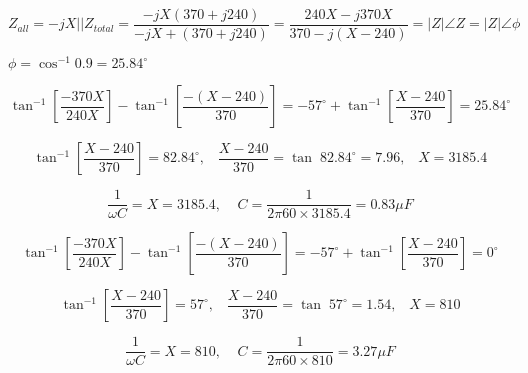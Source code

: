 {\newpage\clearpage
{}%
\begin{displaymath}	Z_{all}=-jX || Z_{total}=\frac{-jX(370+j240)}{-jX+(370+j240)}
  	=\frac{240X-j370X}{370-j(X-240)}=|Z|\angle Z=|Z|\angle \phi	\end{displaymath}%
\lthtmldisplayZ
\lthtmlcheckvsize\clearpage}

{\newpage\clearpage
{}%
$\phi=\cos^{-1} 0.9=25.84^\circ$%
\lthtmlinlinemathZ
\lthtmlcheckvsize\clearpage}

{\newpage\clearpage
{}%
\begin{displaymath}	\tan^{-1}[\frac{-370X}{240X}]-\tan^{-1}[\frac{-(X-240)}{370}]=
  	-57^\circ+\tan^{-1}[\frac{X-240}{370}]=25.84^\circ \end{displaymath}%
\lthtmldisplayZ
\lthtmlcheckvsize\clearpage}

{\newpage\clearpage
{}%
\begin{displaymath}	\tan^{-1}[\frac{X-240}{370}]=82.84^\circ, \;\;\;
  \frac{X-240}{370}=\tan \;82.84^\circ=7.96, \;\;\; X=3185.4 \end{displaymath}%
\lthtmldisplayZ
\lthtmlcheckvsize\clearpage}

{\newpage\clearpage
{}%
\begin{displaymath} \frac{1}{\omega C}=X=3185.4,\;\;\;\;C=\frac{1}{2\pi 60\times 3185.4}
  =0.83 \mu F \end{displaymath}%
\lthtmldisplayZ
\lthtmlcheckvsize\clearpage}

{\newpage\clearpage
{}%
\begin{displaymath}	\tan^{-1}[\frac{-370X}{240X}]-\tan^{-1}[\frac{-(X-240)}{370}]=
  	-57^\circ+\tan^{-1}[\frac{X-240}{370}]=0^\circ \end{displaymath}%
\lthtmldisplayZ
\lthtmlcheckvsize\clearpage}

{\newpage\clearpage
{}%
\begin{displaymath}	\tan^{-1}[\frac{X-240}{370}]=57^\circ, \;\;\;
  \frac{X-240}{370}=\tan \;57^\circ=1.54, \;\;\; X=810 \end{displaymath}%
\lthtmldisplayZ
\lthtmlcheckvsize\clearpage}

{\newpage\clearpage
{}%
\begin{displaymath} \frac{1}{\omega C}=X=810,\;\;\;\;C=\frac{1}{2\pi 60\times 810}
  =3.27 \mu F \end{displaymath}%
\lthtmldisplayZ
\lthtmlcheckvsize\clearpage}

